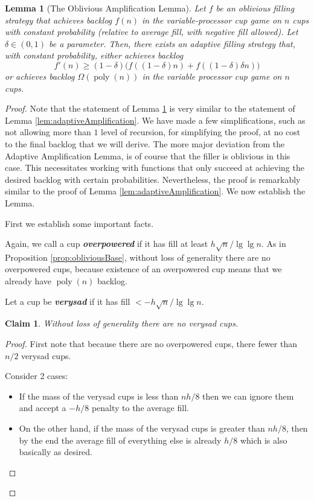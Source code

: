 \documentclass[twocolumn]{article}[10pt]
\newcommand{\defn}[1]{{\textit{\textbf{\boldmath #1}}}\xspace}
\DeclareMathOperator{\poly}{\text{poly}}
\newtheorem{clm}{Claim}
\newtheorem{lemma}{Lemma}
\begin{document}
\begin{lemma}[The Oblivious Amplification Lemma]
  \label{lem:obliviousAmplification}
  Let $f$ be an oblivious filling strategy that achieves backlog $f(n)$ in the
  variable-processor cup game on $n$ cups with constant probability (relative
  to average fill, with negative fill allowed). Let $\delta \in (0,1)$ be a
  parameter. Then, there exists an adaptive filling strategy that, with
  constant probability, either achieves backlog $$f'(n) \ge
  (1-\delta)\Big(f((1-\delta)n) + f((1-\delta)\delta n)\Big)$$ or achieves
  backlog $\Omega(\poly(n))$ in the variable processor cup game on $n$
  cups.
\end{lemma}
\begin{proof}
  {\color{cyan}
  Note that the statement of Lemma \ref{lem:obliviousAmplification} is very
  similar to the statement of Lemma \ref{lem:adaptiveAmplification}.
  We have made a few simplifications, such as not allowing more than $1$
  level of recursion, for simplifying the proof, at no cost to the final
  backlog that we will derive.
  The more major deviation from the Adaptive Amplification Lemma, is of course
  that the filler is oblivious in this case. This necessitates working with
  functions that only succeed at achieving the desired backlog with certain
  probabilities. 
  Nevertheless, the proof is remarkably similar to the proof of Lemma
  \ref{lem:adaptiveAmplification}. We now establish the Lemma.

  First we establish some important facts.

  Again, we call a cup \defn{overpowered} if it has fill at least $h\sqrt{n} /
  \lg\lg n$. As in Proposition \ref{prop:obliviousBase}, without loss of
  generality there are no overpowered cups, because existence of an overpowered
  cup means that we already have $\poly(n)$ backlog.

  Let a cup be \defn{verysad} if it has fill $< -h\sqrt{n}/\lg\lg n$.

\begin{clm}
  Without loss of generality there are no verysad cups. 
\end{clm}
\begin{proof}
  First note that because there are no overpowered cups, there fewer than $n/2$ verysad cups.

  Consider 2 cases:
  \begin{itemize}
    \item If the mass of the verysad cups is less than $nh/8$ then we can
      ignore them and accept a $-h/8$ penalty to the average fill.
    \item On the other hand, if the mass of the verysad cups is greater than
      $nh/8$, then by the end the average fill of everything else is already
      $h/8$ which is also basically as desired.
  \end{itemize}
\end{proof}

}
\end{proof}
\end{document}
